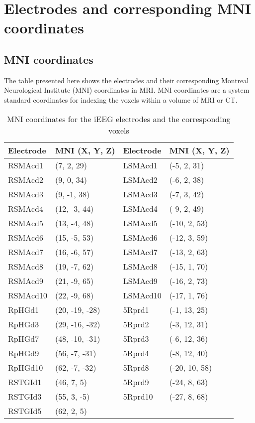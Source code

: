 \chapter{Electrodes and corresponding MNI coordinates}

\section{MNI coordinates}
The table presented here shows the electrodes and their corresponding Montreal Neurological Institute (MNI) coordinates in MRI. MNI coordinates are a system standard coordinates for indexing the voxels within a volume of MRI or CT.

\begin{table}
\centering
\renewcommand{\arraystretch}{1.3} %
\setlength{\tabcolsep}{15pt} %
\begin{tabular}{|l|l|l|l|}
\hline
\textbf{Electrode} & \textbf{MNI (X, Y, Z)}  & \textbf{Electrode} & \textbf{MNI (X, Y, Z)}  \\ 
\hline
RSMAcd1   & (7, 2, 29)     & LSMAcd1   & (-5, 2, 31)   \\ \hline
RSMAcd2   & (9, 0, 34)     & LSMAcd2   & (-6, 2, 38)   \\ \hline
RSMAcd3   & (9, -1, 38)    & LSMAcd3   & (-7, 3, 42)   \\ \hline
RSMAcd4   & (12, -3, 44)   & LSMAcd4   & (-9, 2, 49)   \\ \hline
RSMAcd5   & (13, -4, 48)   & LSMAcd5   & (-10, 2, 53)  \\ \hline
RSMAcd6   & (15, -5, 53)   & LSMAcd6   & (-12, 3, 59)  \\ \hline
RSMAcd7   & (16, -6, 57)   & LSMAcd7   & (-13, 2, 63)  \\ \hline
RSMAcd8   & (19, -7, 62)   & LSMAcd8   & (-15, 1, 70)  \\ \hline
RSMAcd9   & (21, -9, 65)   & LSMAcd9   & (-16, 2, 73)  \\ \hline
RSMAcd10  & (22, -9, 68)   & LSMAcd10  & (-17, 1, 76)  \\ \hline
RpHGd1    & (20, -19, -28) & 5Rprd1    & (-1, 13, 25)  \\ \hline
RpHGd3    & (29, -16, -32) & 5Rprd2    & (-3, 12, 31)  \\ \hline
RpHGd7    & (48, -10, -31) & 5Rprd3    & (-6, 12, 36)  \\ \hline
RpHGd9    & (56, -7, -31)  & 5Rprd4    & (-8, 12, 40)  \\ \hline
RpHGd10   & (62, -7, -32)  & 5Rprd8    & (-20, 10, 58) \\ \hline
RSTGId1   & (46, 7, 5)     & 5Rprd9    & (-24, 8, 63)  \\ \hline
RSTGId3   & (55, 3, -5)    & 5Rprd10   & (-27, 8, 68)  \\ \hline
RSTGId5   & (62, 2, 5)     &           &               \\ \hline
\end{tabular}
\caption{MNI coordinates  for the iEEG electrodes and the corresponding voxels}

\label{table:channel_mni_coordinates_map}
\end{table}